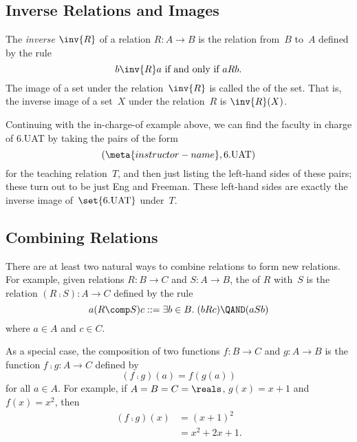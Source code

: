 \subsection{Inverse Relations and Images}

\begin{definition}\label{def:inverse}
The \emph{inverse} $\inv{R}$ of a relation $R: A \to B$ is the
relation from~$B$ to~$A$ defined by the rule
\begin{equation*}
    b \inv{R} a \text{ if and only if } a R b.
\end{equation*}
The image of a set under the relation~$\inv{R}$ is called the
 of the set.  That is, the inverse image of a
set~$X$ under the relation~$R$ is $\inv{R}(X)$.
\end{definition}

Continuing with the in-charge-of example above, we can find the
faculty in charge of 6.UAT by taking the pairs of the form
\begin{equation*}
    (\meta{instructor-name}, \text{6.UAT})
\end{equation*}
for the teaching relation~$T$, and then just listing the left-hand
sides of these pairs; these turn out to be just Eng and Freeman.
These left-hand sides are exactly the inverse image
of~$\set{\text{6.UAT}}$ under~$T$.

\subsection{Combining Relations}

There are at least two natural ways to combine relations to form new
relations.  For example, given relations $R : B \to C$ and $S : A \to
B$, the  of $R$ with~$S$ is the relation $(R \comp
S) : A \to C$ defined by the rule
\begin{equation*}
    a (R \comp S) c ::= \exists b \in B. \; (b R c) \QAND (a S b)
\end{equation*}
where $a \in A$ and $c \in C$.

As a special case, the composition of two functions $f: B \to C$ and
$g: A \to B$ is the function $f \comp g : A \to C$ defined by
\begin{equation*}
    (f \comp g)(a) = f(g(a))
\end{equation*}
for all $a \in A$.  For example, if $A = B = C = \reals$, $g(x) = x +
1$ and $f(x) = x^2$, then
\begin{align*}
    (f \comp g)(x) &= (x + 1)^2 \\
                   &= x^2 + 2x + 1.
\end{align*}

